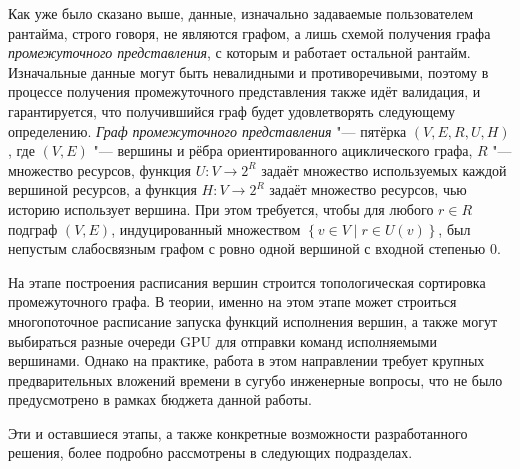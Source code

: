 Как уже было сказано выше, данные, изначально задаваемые пользователем рантайма, строго говоря, не являются графом, а лишь схемой получения графа \textit{промежуточного представления}, с которым и работает остальной рантайм.
Изначальные данные могут быть невалидными и противоречивыми, поэтому в процессе получения промежуточного представления также идёт валидация, и гарантируется, что получившийся граф будет удовлетворять следующему определению.
\textit{Граф промежуточного представления} "--- пятёрка $(V, E, R, U, H)$, где $(V, E)$ "--- вершины и рёбра ориентированного ациклического графа, $R$ "--- множество ресурсов, функция $U : V \to 2^R$ задаёт множество используемых каждой вершиной ресурсов, а функция $H : V \to 2^R$ задаёт множество ресурсов, чью историю использует вершина.
При этом требуется, чтобы для любого $r\in R$ подграф $(V, E)$, индуцированный множеством $\left\{v \in V \mid r \in U(v)\right\}$, был непустым слабосвязным графом с ровно одной вершиной с входной степенью $0$.

На этапе построения расписания вершин строится топологическая сортировка промежуточного графа.
В теории, именно на этом этапе может строиться многопоточное расписание запуска функций исполнения вершин, а также могут выбираться разные очереди GPU для отправки команд исполняемыми вершинами.
Однако на практике, работа в этом направлении требует крупных предварительных вложений времени в сугубо инженерные вопросы, что не было предусмотрено в рамках бюджета данной работы.

Эти и оставшиеся этапы, а также конкретные возможности разработанного решения, более подробно рассмотрены в следующих подразделах.

